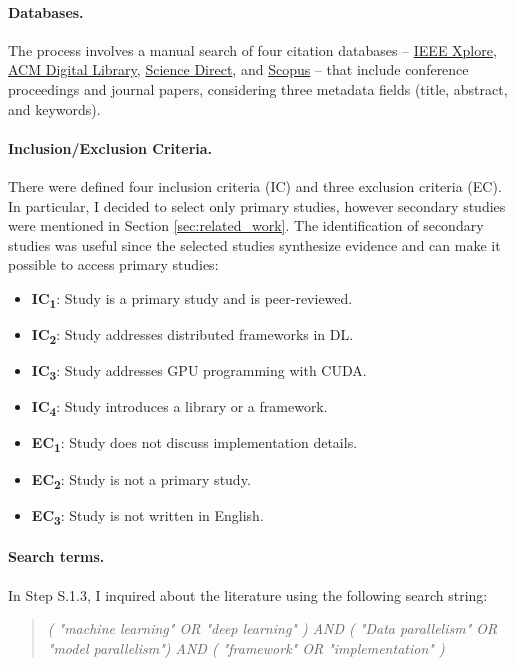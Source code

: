 \paragraph{Databases.}
The process involves a manual search of four citation databases --
\href{https://ieeexplore.ieee.org/}{IEEE Xplore}, \href{https://dl.acm.org/}{ACM Digital Library},
\href{https://www.sciencedirect.com/}{Science Direct}, and \href{https://www.scopus.com/}{Scopus}
-- that include conference proceedings and journal papers, considering three metadata fields
(title, abstract, and keywords).

\paragraph{Inclusion/Exclusion Criteria.}
There were defined four inclusion criteria (IC) and three exclusion criteria (EC). In particular, I
decided to select only primary studies, however secondary studies were mentioned in Section
\ref{sec:related_work}. The identification of secondary studies was useful since the selected
studies synthesize evidence and can make it possible to access primary studies:

\begin{itemize}
	\item \textbf{IC\textsubscript{1}}: Study is a primary study and is peer-reviewed.
	\item \textbf{IC\textsubscript{2}}: Study addresses distributed frameworks in DL.
	\item \textbf{IC\textsubscript{3}}: Study addresses GPU programming with CUDA.
	\item \textbf{IC\textsubscript{4}}: Study introduces a library or a framework. \\
	\item \textbf{EC\textsubscript{1}}: Study does not discuss implementation details.
	\item \textbf{EC\textsubscript{2}}: Study is not a primary study.
	\item \textbf{EC\textsubscript{3}}: Study is not written in English.
\end{itemize}

\paragraph{Search terms.}
In Step S.1.3, I inquired about the literature using the following search string:
\begin{quote}
	\textit{( "machine learning" OR "deep learning" )
		AND
		( "Data parallelism" OR "model parallelism")
		AND
		( "framework" OR "implementation" )}
\end{quote}

